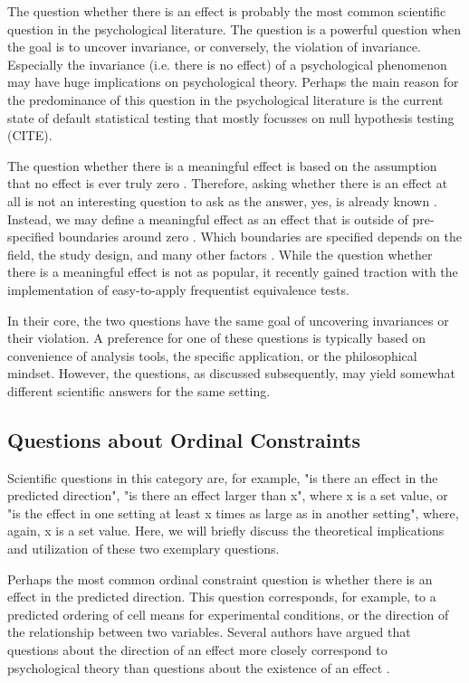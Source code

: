 \documentclass[natbib,doc,12pt,floatsintext]{apa6}
\begin{document}
The question whether there is an effect is probably the most common scientific question in the psychological literature. The question is a powerful question when the goal is to uncover invariance, or conversely, the violation of invariance. Especially the invariance (i.e. there is no effect) of a psychological phenomenon may have huge implications on psychological theory. Perhaps the main reason for the predominance of this question in the psychological literature is the current state of default statistical testing that mostly focusses on null hypothesis testing (CITE).

The question whether there is a meaningful effect is based on the assumption that no effect is ever truly zero \citep{Cohen:1994}. Therefore, asking whether there is an effect at all is not an interesting question to ask as the answer, yes, is already known \citep{Morey:Rouder:2011, Meehl:1978, Berger:Delampady:1987}. Instead, we may define a meaningful effect as an effect that is outside of pre-specified boundaries around zero \citep{Lakens:2017}. Which boundaries are specified depends on the field, the study design, and many other factors \citep{Lakens:etal:2018}. While the question whether there is a meaningful effect is not as popular, it recently gained traction with the implementation of easy-to-apply frequentist equivalence tests. 

In their core, the two questions have the same goal of uncovering invariances or their violation. A preference for one of these questions is typically based on convenience of analysis tools, the specific application, or the philosophical mindset. However, the questions, as discussed subsequently, may yield somewhat different scientific answers for the same setting. 

\subsection{Questions about Ordinal Constraints}

Scientific questions in this category are, for example, "is there an effect in the predicted direction", "is there an effect larger than x", where x is a set value, or "is the effect in one setting at least x times as large as in another setting", where, again, x is a set value. Here, we will briefly discuss the theoretical implications and utilization of these two exemplary questions.

Perhaps the most common ordinal constraint question is whether there is an effect in the predicted direction. This question corresponds, for example, to a predicted ordering of cell means for experimental conditions, or the direction of the relationship between two variables. Several authors have argued that questions about the direction of an effect more closely correspond to psychological theory than questions about the existence of an effect \citep{Gu:etal:2014, Haaf:etal:2019}.
\end{document}
